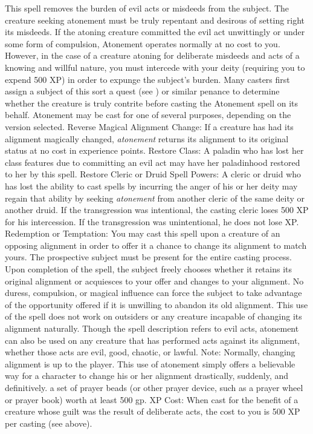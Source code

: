 This spell removes the burden of evil acts or misdeeds from the subject. The creature
seeking atonement must be truly repentant and desirous of setting right its misdeeds.
If the atoning creature committed the evil act unwittingly or under some form of
compulsion, Atonement operates normally at no cost to you. However, in
the case of a creature atoning for deliberate misdeeds and acts of a knowing and
willful nature, you must intercede with your deity (requiring you to expend 500
XP) in order to expunge the subject's burden. Many casters first assign a subject
of this sort a quest (see ) or similar penance to determine
whether the creature is truly contrite before casting the Atonement spell
on its behalf.
Atonement may be cast for one of several purposes, depending on the version
selected.
Reverse Magical Alignment Change: If a creature has had its alignment
magically changed, \textit{atonement} returns its alignment to its original status
at no cost in experience points.
Restore Class: A paladin who has lost her class features due to committing
an evil act may have her paladinhood restored to her by this spell.
Restore Cleric or Druid Spell Powers: A cleric or druid who has lost the
ability to cast spells by incurring the anger of his or her deity may regain that
ability by seeking \textit{atonement} from another cleric of the same deity or
another druid. If the transgression was intentional, the casting cleric loses 500
XP for his intercession. If the transgression was unintentional, he does not lose
XP.
Redemption or Temptation: You may cast this spell upon a creature of an
opposing alignment in order to offer it a chance to change its alignment to match
yours. The prospective subject must be present for the entire casting process.
Upon completion of the spell, the subject freely chooses whether it retains its
original alignment or acquiesces to your offer and changes to your alignment. No
duress, compulsion, or magical influence can force the subject to take advantage
of the opportunity offered if it is unwilling to abandon its old alignment. This
use of the spell does not work on outsiders or any creature incapable of changing
its alignment naturally.
Though the spell description refers to evil acts, atonement can also be
used on any creature that has performed acts against its alignment, whether those
acts are evil, good, chaotic, or lawful.
Note: Normally, changing alignment is up to the player. This use of atonement simply offers a believable way for a character to change his or her alignment drastically, suddenly, and definitively.
a set of prayer beads (or other prayer device, such as a prayer wheel or prayer
book) worth at least 500 gp.
XP Cost: When cast for the benefit of a creature whose guilt was the result
of deliberate acts, the cost to you is 500 XP per casting (see above).